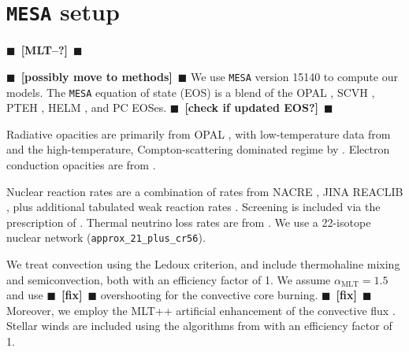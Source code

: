 \documentclass[twocolumn,twocolappendix,trackchanges]{aastex63}
\newcommand{\code}[1]{\texttt{#1}}
\newcommand{\todo}[1]{{\large $\blacksquare$~\textbf{\color{red}[#1]}}~$\blacksquare$}
\begin{document}



\appendix

\section{\texttt{MESA} setup}
\label{sec:software}

\todo{MLT--?}

\todo{possibly move to methods}
We use \code{MESA} version 15140 to compute our models.  The
\code{MESA} equation of state (EOS) is a blend of the OPAL \citet{Rogers2002}, SCVH
\citet{Saumon1995}, PTEH \citet{Pols1995}, HELM \citet{Timmes2000},
and PC \citet{Potekhin2010} EOSes. \todo{check if updated EOS?}

Radiative opacities are primarily from OPAL \citep{Iglesias1993,
  Iglesias1996}, with low-temperature data from \citet{Ferguson2005}
and the high-temperature, Compton-scattering dominated regime by
\citet{Buchler1976}. Electron conduction opacities are from
\citet{Cassisi2007}.

Nuclear reaction rates are a combination of rates from NACRE
\citep{Angulo1999}, JINA REACLIB \citep{Cyburt2010}, plus additional
tabulated weak reaction rates \citet{Fuller1985, Oda1994,
  Langanke2000}. Screening is included via the prescription of
\citet{Chugunov2007}.  Thermal neutrino loss rates are from
\citet{Itoh1996}. We use a
22-isotope nuclear network (\texttt{approx\_21\_plus\_cr56}).

We treat convection using the Ledoux criterion, and include
thermohaline mixing and semiconvection, both with an efficiency factor
of 1. We assume $\alpha_\mathrm{MLT}=1.5$ and use \todo{fix}
\cite{brott:11} overshooting for the convective core
burning. \todo{fix} Moreover, we employ the MLT++ artificial
enhancement of the convective flux \citep[e.g.,][]{paxton:15}. Stellar
winds are included using the algorithms from \cite{vink:01} with an
efficiency factor of
1.%
\end{document}
